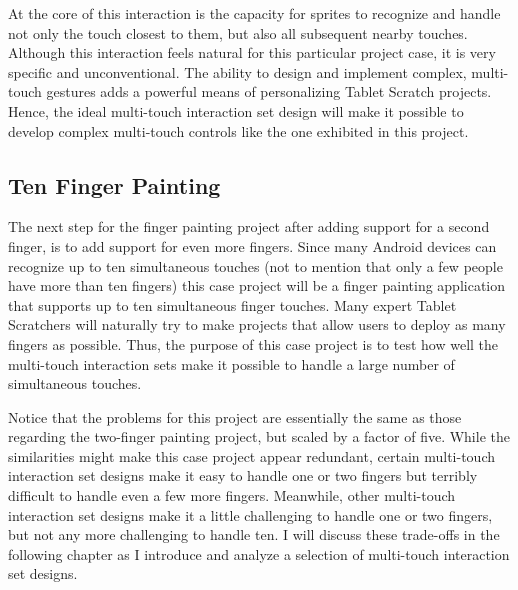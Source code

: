 At the core of this interaction is the capacity for sprites to recognize and handle not only the touch closest to them, but also all subsequent nearby touches. Although this interaction feels natural for this particular project case, it is very specific and unconventional. The ability to design and implement complex, multi-touch gestures adds a powerful means of personalizing Tablet Scratch projects. Hence, the ideal multi-touch interaction set design will make it possible to develop complex multi-touch controls like the one exhibited in this project.

\subsection{Ten Finger Painting}
The next step for the finger painting project after adding support for a second finger, is to add support for even more fingers. Since many Android devices can recognize up to ten simultaneous touches (not to mention that only a few people have more than ten fingers) this case project will be a finger painting application that supports up to ten simultaneous finger touches. Many expert Tablet Scratchers will naturally try to make projects that allow users to deploy as many fingers as possible. Thus, the purpose of this case project is to test how well the multi-touch interaction sets make it possible to handle a large number of simultaneous touches. 

Notice that the problems for this project are essentially the same as those regarding the two-finger painting project, but scaled by a factor of five. While the similarities might make this case project appear redundant, certain multi-touch interaction set designs make it easy to handle one or two fingers but terribly difficult to handle even a few more fingers. Meanwhile, other multi-touch interaction set designs make it a little challenging to handle one or two fingers, but not any more challenging to handle ten. I will discuss these trade-offs in the following chapter as I introduce and analyze a selection of multi-touch interaction set designs.
